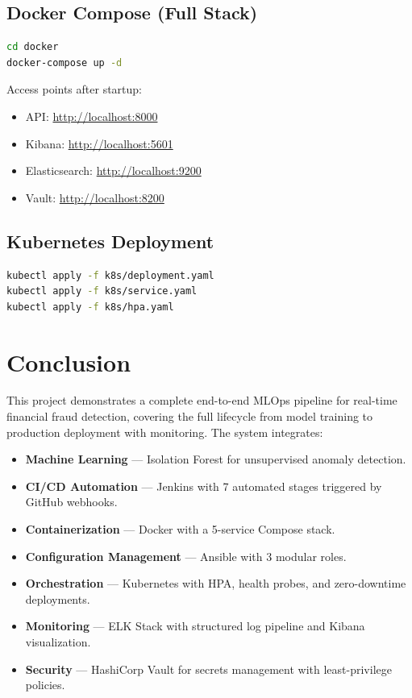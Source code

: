 \documentclass[12pt,a4paper]{article}
\begin{document}
\subsection{Docker Compose (Full Stack)}

\begin{lstlisting}[language=bash,caption={Docker Compose Setup}]
cd docker
docker-compose up -d
\end{lstlisting}

Access points after startup:
\begin{itemize}
    \item API: \url{http://localhost:8000}
    \item Kibana: \url{http://localhost:5601}
    \item Elasticsearch: \url{http://localhost:9200}
    \item Vault: \url{http://localhost:8200}
\end{itemize}

\subsection{Kubernetes Deployment}

\begin{lstlisting}[language=bash,caption={Kubernetes Deployment}]
kubectl apply -f k8s/deployment.yaml
kubectl apply -f k8s/service.yaml
kubectl apply -f k8s/hpa.yaml
\end{lstlisting}

\section{Conclusion}

This project demonstrates a complete end-to-end MLOps pipeline for real-time financial fraud detection, covering the full lifecycle from model training to production deployment with monitoring. The system integrates:

\begin{itemize}
    \item \textbf{Machine Learning} --- Isolation Forest for unsupervised anomaly detection.
    \item \textbf{CI/CD Automation} --- Jenkins with 7 automated stages triggered by GitHub webhooks.
    \item \textbf{Containerization} --- Docker with a 5-service Compose stack.
    \item \textbf{Configuration Management} --- Ansible with 3 modular roles.
    \item \textbf{Orchestration} --- Kubernetes with HPA, health probes, and zero-downtime deployments.
    \item \textbf{Monitoring} --- ELK Stack with structured log pipeline and Kibana visualization.
    \item \textbf{Security} --- HashiCorp Vault for secrets management with least-privilege policies.
\end{itemize}
\end{document}
